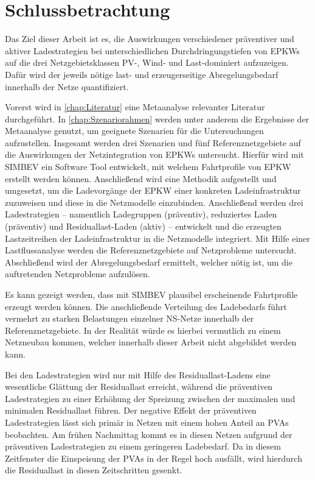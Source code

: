 \section{Schlussbetrachtung}\label{chap:schlussbetrachtung}

Das Ziel dieser Arbeit ist es, die Auswirkungen verschiedener präventiver und aktiver Ladestrategien bei unterschiedlichen Durchdringungstiefen von \glspl{EPKW} auf die drei Netzgebietsklassen \gls{PV}-, Wind- und Last-dominiert aufzuzeigen.
Dafür wird der jeweils nötige last- und erzeugerseitige Abregelungsbedarf innerhalb der Netze quantifiziert.\medskip

Vorerst wird in \autoref{chap:Literatur} eine Metaanalyse relevanter Literatur durchgeführt.
In \autoref{chap:Szenariorahmen} werden unter anderem die Ergebnisse der Metaanalyse genutzt, um geeignete Szenarien für die Untersuchungen aufzustellen.
Insgesamt werden drei Szenarien und fünf Referenznetzgebiete auf die Auswirkungen der Netzintegration von \glspl{EPKW} untersucht.
Hierfür wird mit \gls{SIMBEV} ein Software Tool entwickelt, mit welchem Fahrtprofile von \gls{EPKW} erstellt werden können.
Anschließend wird eine Methodik aufgestellt und umgesetzt, um die Ladevorgänge der \gls{EPKW} einer konkreten Ladeinfrastruktur zuzuweisen und diese in die Netzmodelle einzubinden.
Anschließend werden drei Ladestrategien {--} namentlich Ladegruppen (präventiv), reduziertes Laden (präventiv) und Residuallast-Laden (aktiv) {--} entwickelt und die erzeugten Lastzeitreihen der Ladeinfrastruktur in die Netzmodelle integriert.
Mit Hilfe einer Lastflussanalyse werden die Referenznetzgebiete auf Netzprobleme untersucht.
Abschließend wird der Abregelungsbedarf ermittelt, welcher nötig ist, um die auftretenden Netzprobleme aufzulösen.\medskip

Es kann gezeigt werden, dass mit \gls{SIMBEV} plausibel erscheinende Fahrtprofile erzeugt werden können.
Die anschließende Verteilung des Ladebedarfs führt vermehrt zu starken Belastungen einzelner \gls{NS}-Netze innerhalb der Referenznetzgebiete.
In der Realität würde es hierbei vermutlich zu einem Netzneubau kommen, welcher innerhalb dieser Arbeit nicht abgebildet werden kann.\medskip

Bei den Ladestrategien wird nur mit Hilfe des Residuallast-Ladens eine wesentliche Glättung der Residuallast erreicht, während die präventiven Ladestrategien zu einer Erhöhung der Spreizung zwischen der maximalen und minimalen Residuallast führen.
Der negative Effekt der präventiven Ladestrategien lässt sich primär in Netzen mit einem hohen Anteil an \glspl{PVA} beobachten.
Am frühen Nachmittag kommt es in diesen Netzen aufgrund der präventiven Ladestrategien zu einem geringeren Ladebedarf.
Da in diesem Zeitfenster die Einspeisung der \glspl{PVA} in der Regel hoch ausfällt, wird hierdurch die Residuallast in diesen Zeitschritten gesenkt.\medskip

